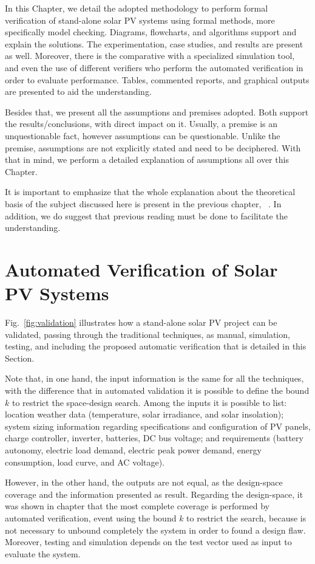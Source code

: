 In this Chapter, we detail the adopted methodology to perform formal verification of stand-alone solar PV systems using formal methods, more specifically model checking. Diagrams, flowcharts, and algorithms support and explain the solutions. The experimentation, case studies, and results are present as well. Moreover, there is the comparative with a specialized simulation tool, and even the use of different verifiers who perform the automated verification in order to evaluate performance. Tables, commented reports, and graphical outputs are presented to aid the understanding.

Besides that, we present all the assumptions and premises adopted. Both support the results/conclusions, with direct impact on it. Usually, a premise is an unquestionable fact, however assumptions can be questionable. Unlike the premise, assumptions are not explicitly stated and need to be deciphered. With that in mind, we perform a detailed explanation of assumptions all over this Chapter.

It is important to emphasize that the whole explanation about the theoretical basis of the subject discussed here is present in the previous chapter, ~. In addition, we do suggest that previous reading must be done to facilitate the understanding.


\section{Automated Verification of Solar PV Systems}

Fig.~\ref{fig:validation} illustrates how a stand-alone solar PV project can be validated, passing through the traditional techniques, as manual, simulation, testing, and including the proposed automatic verification that is detailed in this Section. 

Note that, in one hand, the input information is the same for all the techniques, with the difference that in automated validation it is possible to define the bound $k$ to restrict the space-design search. Among the inputs it is possible to list: location weather data (temperature, solar irradiance, and solar insolation); system sizing information regarding specifications and configuration of PV panels, charge controller, inverter, batteries, DC bus  voltage; and requirements (battery autonomy, electric load demand, electric peak power demand, energy consumption, load curve, and AC voltage).

However, in the other hand, the outputs are not equal, as the design-space coverage and the information presented as result. Regarding the design-space, it was shown in  chapter  that the most complete coverage is performed by automated verification, event using the bound $k$ to restrict the search, because is not necessary to unbound completely the system in order to found a design flaw. Moreover, testing and simulation depends on the test vector used as input to evaluate the system.


